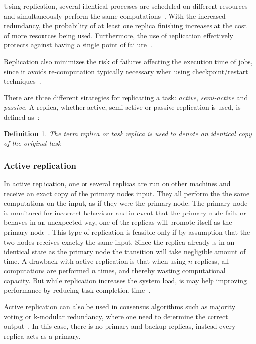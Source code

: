 \documentclass{cslthse-msc}
\newtheorem{definition}{Definition}[chapter]
\begin{document}
Using replication, several identical processes are scheduled on different resources and simultaneously perform the same computations~\cite{relGridSystems}. With the increased redundancy, the probability of at least one replica finishing increases at the cost of more resources being used. Furthermore, the use of replication effectively protects against having a single point of failure~\cite{faultToleranceGrid}.

Replication also minimizes the risk of failures affecting the execution time of jobs, since it avoids re-computation typically necessary when using checkpoint/restart techniques~\cite{designFaultTolerantSched}.

There are three different strategies for replicating a task: \emph{active}, \emph{semi-active} and \emph{passive}. A replica, whether active, semi-active or passive replication is used, is defined as~\cite{effTaskReplMobGrid}:
\begin{definition} \label{def:replica}
The term replica or task replica is used to denote an identical copy of the original task
\end{definition}

\subsubsection{Active replication} \label{subsec:active_replication}
In active replication, one or several replicas are run on other machines and receive an exact copy of the primary nodes input. They all perform the the same computations on the input, as if they were the primary node. The primary node is monitored for incorrect behaviour and in event that the primary node fails or behaves in an unexpected way, one of the replicas will promote itself as the primary node~\cite{surveyFaultParallel}. This type of replication is feasible only if by assumption that the two nodes receives exactly the same input. Since the replica already is in an identical state as the primary node the transition will take negligible amount of time. A drawback with active replication is that when using $n$ replicas, all computations are performed $n$ times, and thereby wasting computational capacity. But while replication increases the system load, is may help improving performance by reducing task completion time~\cite{improvingPerformanceReplication}.

Active replication can also be used in consensus algorithms such as majority voting or k-modular redundancy, where one need to determine the correct output~\cite{surveyFaultParallel}. In this case, there is no primary and backup replicas, instead every replica acts as a primary.
\end{document}
